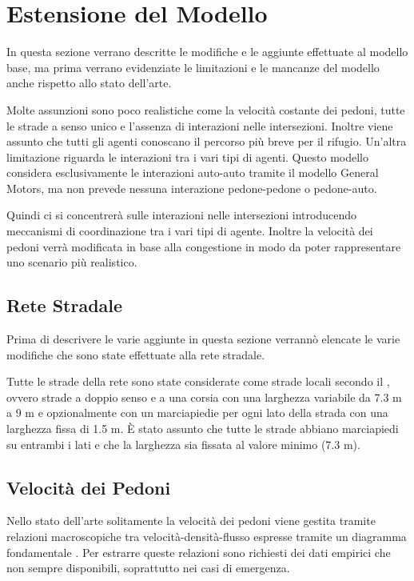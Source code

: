 \section{Estensione del Modello}
\label{sec:estensione}
In questa sezione verrano descritte le modifiche e le aggiunte effettuate al modello base,
ma prima verrano evidenziate le limitazioni e le mancanze del modello anche rispetto allo stato dell'arte.

Molte assunzioni sono poco realistiche come la velocità costante dei pedoni, tutte le strade a senso unico e l'assenza di interazioni nelle
intersezioni.
%
Inoltre viene assunto che tutti gli agenti conoscano il percorso più breve per il rifugio.
%
Un'altra limitazione riguarda le interazioni tra i vari tipi di agenti.
Questo modello considera esclusivamente le interazioni auto-auto
tramite il modello General Motors, ma non prevede nessuna interazione pedone-pedone o pedone-auto.

Quindi ci si concentrerà sulle interazioni nelle intersezioni introducendo meccanismi di coordinazione tra i vari tipi di agente.
Inoltre la velocità dei pedoni verrà modificata in base alla congestione in modo da poter rappresentare uno scenario più realistico.

\subsection{Rete Stradale}
Prima di descrivere le varie aggiunte in questa sezione verrannò elencate le varie modifiche che sono state effettuate alla rete stradale.

Tutte le strade della rete sono state considerate come strade locali secondo il \textcite{seaside2010tsp},
ovvero strade a doppio senso e a una corsia con una larghezza variabile da 7.3 m a 9 m e opzionalmente con
un marciapiedie per ogni lato della strada con una larghezza fissa di 1.5 m.
%
È stato assunto che tutte le strade abbiano marciapiedi su entrambi i lati e che la larghezza sia fissata al valore minimo (7.3 m).

\newpage
\subsection{Velocità dei Pedoni}
Nello stato dell'arte solitamente la velocità dei pedoni viene gestita tramite relazioni macroscopiche tra velocità-densità-flusso
espresse tramite un diagramma fondamentale \parencite{nikolic2016probabilistic}.
Per estrarre queste relazioni sono richiesti dei dati empirici che non sempre disponibili, soprattutto nei casi di emergenza.


